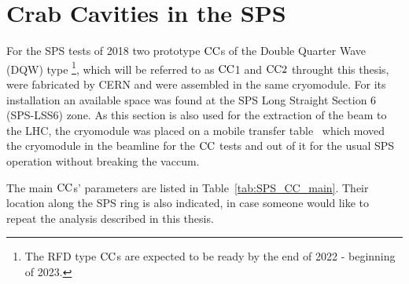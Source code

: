 \section{Crab Cavities in the SPS}\label{sec:CCs_sps_details}
For the SPS tests of 2018 two prototype ${\mathrm{CC}}$s of the Double Quarter Wave (DQW) type \footnote{The RFD type ${\mathrm{CC}}$s are expected to be ready by the end of 2022 - beginning of 2023.}, which will be referred to as ${\mathrm{CC}}$1 and ${\mathrm{CC}}2$ throught this thesis, were fabricated by CERN and were assembled in the same cryomodule. %
For its installation an available space was found at the SPS Long Straight Section 6 (SPS-LSS6) zone. As this section is also used for the extraction of the beam to the LHC, the cryomodule was placed on a mobile transfer table~\cite{Calaga:2649807} which  moved the cryomodule in the beamline for the ${\mathrm{CC}}$ tests and out of it for the usual SPS operation without breaking the vaccum.
 
 The main ${\mathrm{CC}}$s' parameters are listed in Table~\ref{tab:SPS_CC_main}. Their location along the SPS ring is also indicated, in case someone would like to repeat the analysis described in this thesis.

